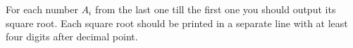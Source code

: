 For each number $A_{i}$ from the last one till the first one you should output its square root. Each square root should be printed in a separate line with at least four digits after decimal point.